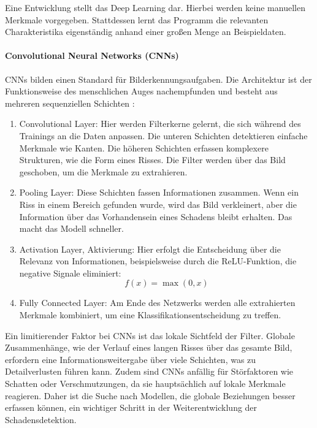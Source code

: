Eine Entwicklung stellt das Deep Learning dar. Hierbei werden keine manuellen Merkmale vorgegeben. Stattdessen lernt das Programm die relevanten Charakteristika eigenständig anhand einer großen Menge an Beispieldaten.

\paragraph{Convolutional Neural Networks (CNNs)}
CNNs bilden einen Standard für Bilderkennungsaufgaben. Die Architektur ist der Funktionsweise des menschlichen Auges nachempfunden und besteht aus mehreren sequenziellen Schichten \cite{oshea2015introduction}:
\begin{enumerate}
    \item Convolutional Layer: Hier werden Filterkerne gelernt, die sich während des Trainings an die Daten anpassen. Die unteren Schichten detektieren einfache Merkmale wie Kanten. Die höheren Schichten erfassen komplexere Strukturen, wie die Form eines Risses. Die Filter werden über das Bild geschoben, um die Merkmale zu extrahieren.
    \item Pooling Layer: Diese Schichten fassen Informationen zusammen. Wenn ein Riss in einem Bereich gefunden wurde, wird das Bild verkleinert, aber die Information über das Vorhandensein eines Schadens bleibt erhalten. Das macht das Modell schneller.
    \item Activation Layer, Aktivierung: Hier erfolgt die Entscheidung über die Relevanz von Informationen, beispielsweise durch die ReLU-Funktion, die negative Signale eliminiert:
    \begin{equation}
        f(x) = \max(0, x)
    \end{equation}
    \item Fully Connected Layer: Am Ende des Netzwerks werden alle extrahierten Merkmale kombiniert, um eine Klassifikationsentscheidung zu treffen.
\end{enumerate}

Ein limitierender Faktor bei CNNs ist das lokale Sichtfeld der Filter. Globale Zusammenhänge, wie der Verlauf eines langen Risses über das gesamte Bild, erfordern eine Informationsweitergabe über viele Schichten, was zu Detailverlusten führen kann. Zudem sind CNNs anfällig für Störfaktoren wie Schatten oder Verschmutzungen, da sie hauptsächlich auf lokale Merkmale reagieren. Daher ist die Suche nach Modellen, die globale Beziehungen besser erfassen können, ein wichtiger Schritt in der Weiterentwicklung der Schadensdetektion.

